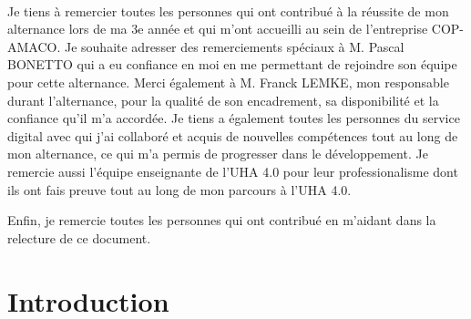 \documentclass[12pt]{article}
\begin{document}


\begin{titlepage}
    \centering
    \begin{Large}
    \end{Large}\\[3pt]
    
    \begin{justify} 
    \justify
	Je tiens à remercier toutes les personnes qui ont contribué à la réussite de mon alternance lors de ma 3e année et qui m'ont accueilli au sein de l'entreprise COP-AMACO.
    \justify
    Je souhaite adresser des remerciements spéciaux à M. Pascal BONETTO qui a eu confiance en moi en me permettant de rejoindre son équipe pour cette alternance.
    \justify
    Merci également à M. Franck LEMKE, mon responsable durant l'alternance, pour la qualité de son encadrement, sa disponibilité et la confiance qu'il m'a accordée.
    \justify
    Je tiens a également  toutes les personnes du service digital avec qui j'ai collaboré et acquis de nouvelles compétences tout au long de mon alternance, ce qui m'a permis de progresser dans le développement.
    \justify
    Je remercie aussi l'équipe enseignante de l'UHA 4.0 pour leur professionalisme dont ils ont fais preuve tout au long de mon parcours à l'UHA 4.0.

    \justify
    Enfin, je remercie toutes les personnes qui ont contribué en m'aidant dans la relecture de ce document. 
    
    \end{justify}
    
\newpage
\end{titlepage}
\thispagestyle{empty}
\tableofcontents



\newpage
\setcounter{page}{1} %
\centering
\vspace{2cm}
\section*{Introduction}
\vspace{2cm}
\thispagestyle{empty} %
\centering %
\end{document}
